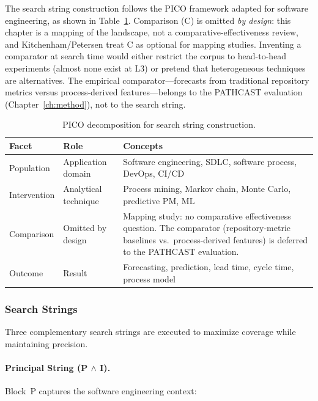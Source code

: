 The search string construction follows the PICO framework adapted for
software engineering, as shown in Table~\ref{tab:pico}. Comparison (C) is
omitted \emph{by design}: this chapter is a mapping of the landscape, not a
comparative-effectiveness review, and Kitchenham/Petersen treat C as optional
for mapping studies. Inventing a comparator at search time would either
restrict the corpus to head-to-head experiments (almost none exist at L3) or
pretend that heterogeneous techniques are alternatives. The empirical
comparator---forecasts from traditional repository metrics versus
process-derived features---belongs to the PATHCAST evaluation
(Chapter~\ref{ch:method}), not to the search string.

\begin{table}[htbp]
\centering
\caption{PICO decomposition for search string construction.}
\label{tab:pico}
\begin{tabular}{lp{4cm}p{7cm}}
\toprule
\textbf{Facet} & \textbf{Role} & \textbf{Concepts} \\
\midrule
Population    & Application domain    & Software engineering, SDLC, software process,
                                        DevOps, CI/CD \\
Intervention  & Analytical technique  & Process mining, Markov chain, Monte Carlo,
                                        predictive PM, ML \\
Comparison    & Omitted by design      & Mapping study: no comparative
                                        effectiveness question. The comparator
                                        (repository-metric baselines vs.\
                                        process-derived features) is deferred
                                        to the PATHCAST evaluation. \\
Outcome       & Result                & Forecasting, prediction, lead time, cycle time,
                                        process model \\
\bottomrule
\end{tabular}
\end{table}

\subsubsection{Search Strings}

Three complementary search strings are executed to maximize coverage while
maintaining precision.

\paragraph{Principal String (P $\wedge$ I).}
Block~P captures the software engineering context:


